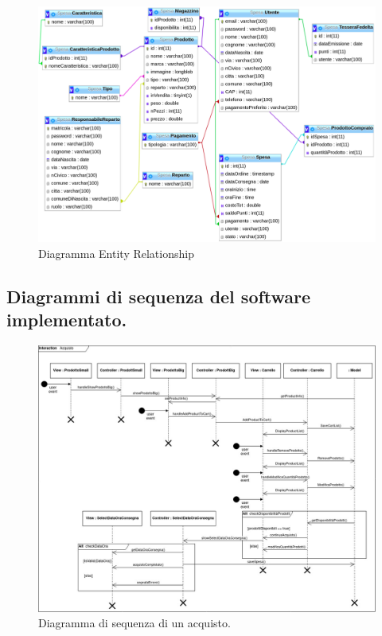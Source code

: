 \documentclass{article}
\begin{document}
\begin{figure}[h!]
	\centering
	\includegraphics[width=\textwidth]{DiagrammaER.png}
	\caption{Diagramma Entity Relationship}
	\label{fig:DiagrammaER}
	\newpage
\end{figure}
\subsection{Diagrammi di sequenza del software implementato.}
\begin{figure}[h!]
	\centering
	\includegraphics[width=\textwidth]{SDAcquisto.jpg}
	\caption{Diagramma di sequenza di un acquisto.}
	\label{SDAcquisto.jpg}
	\newpage
\end{figure}
\end{document}
